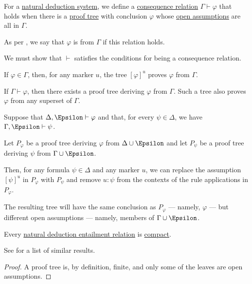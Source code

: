 \begin{definition}\label{def:natural_deduction_entailment}
  For a \hyperref[def:abstract_propositional_natural_deduction_system]{natural deduction system}, we define a \hyperref[def:consequence_relation]{consequence relation} \( \Gamma \vdash \varphi \) that holds when there is a \hyperref[def:natural_deduction_proof_tree]{proof tree} with conclusion \( \varphi \) whose \hyperref[def:natural_deduction_open_assumptions]{open assumptions} are all in \( \Gamma \).

  As per , we say that \( \varphi \) is  from \( \Gamma \) if this relation holds.
\end{definition}
\begin{defproof}
  We must show that \( {\vdash} \) satisfies the conditions for being a consequence relation.

   If \( \varphi \in \Gamma \), then, for any marker \( u \), the tree \( [\varphi]^u \) proves \( \varphi \) from \( \Gamma \).

   If \( \Gamma \vdash \varphi \), then there exists a proof tree deriving \( \varphi \) from \( \Gamma \). Such a tree also proves \( \varphi \) from any superset of \( \Gamma \).

   Suppose that \( \Delta, \Epsilon \vdash \varphi \) and that, for every \( \psi \in \Delta \), we have \( \Gamma, \Epsilon \vdash \psi \).

  Let \( P_\varphi \) be a proof tree deriving \( \varphi \) from \( \Delta \cup \Epsilon \) and let \( P_\psi \) be a proof tree deriving \( \psi \) from \( \Gamma \cup \Epsilon \).

  Then, for any formula \( \psi \in \Delta \) and any marker \( u \), we can replace the assumption \( [\psi]^u \) in \( P_\varphi \) with \( P_\psi \) and remove \( u: \psi \) from the contexts of the rule applications in \( P_\varphi \).

  The resulting tree will have the same conclusion as \( P_\varphi \) --- namely, \( \varphi \) --- but different open assumptions --- namely, members of \( \Gamma \cup \Epsilon \).
\end{defproof}

\begin{proposition}\label{thm:propositional_natural_deduction_entailment_compact}
  Every \hyperref[def:natural_deduction_entailment]{natural deduction entailment relation} is \hyperref[def:consequence_relation/compactness]{compact}.
\end{proposition}
\begin{comments}
  \item See  for a list of similar results.
\end{comments}
\begin{proof}
  A proof tree is, by definition, finite, and only some of the leaves are open assumptions.
\end{proof}

